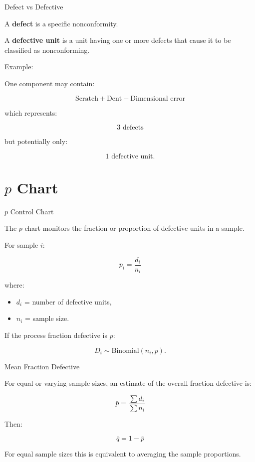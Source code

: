 \documentclass[aspectratio=169,10pt]{beamer}
\begin{document}
\begin{frame}[shrink=18]{Defect vs Defective}
\small

A \textbf{defect} is a specific nonconformity.

A \textbf{defective unit} is a unit having one or more defects that
cause it to be classified as nonconforming.

Example:

One component may contain:

\[
\text{Scratch}+\text{Dent}+\text{Dimensional error}
\]

which represents:

\[
3\text{ defects}
\]

but potentially only:

\[
1\text{ defective unit}.
\]

\end{frame}


\section{$p$ Chart}

\begin{frame}[shrink=18]{$p$ Control Chart}
\small

The \(p\)-chart monitors the fraction or proportion of defective
units in a sample.

For sample \(i\):

\[
\boxed{
p_i=
\frac{d_i}{n_i}
}
\]

where:

\begin{itemize}
    \item \(d_i\) = number of defective units,
    \item \(n_i\) = sample size.
\end{itemize}

If the process fraction defective is \(p\):

\[
D_i\sim\mathrm{Binomial}(n_i,p).
\]

\end{frame}


\begin{frame}[shrink=18]{Mean Fraction Defective}
\small

For equal or varying sample sizes, an estimate of the overall
fraction defective is:

\[
\boxed{
\bar p
=
\frac{\sum d_i}{\sum n_i}
}
\]

Then:

\[
\boxed{
\bar q=1-\bar p
}
\]

For equal sample sizes this is equivalent to averaging the
sample proportions.

\end{frame}
\end{document}
